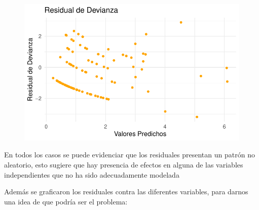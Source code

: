 \documentclass[
  letterpaper,
  DIV=11,
  numbers=noendperiod]{scrartcl}
\begin{document}
\begin{figure}
%
\begin{minipage}{0.50\linewidth}
\includegraphics{Modelos_files/figure-pdf/unnamed-chunk-24-4.pdf}\end{minipage}%

\end{figure}%

En todos los casos se puede evidenciar que los residuales presentan un
patrón no aleatorio, esto sugiere que hay presencia de efectos en alguna
de las variables independientes que no ha sido adecuadamente modelada

Además se graficaron los residuales contra las diferentes variables,
para darnos una idea de que podría ser el problema:
\end{document}
